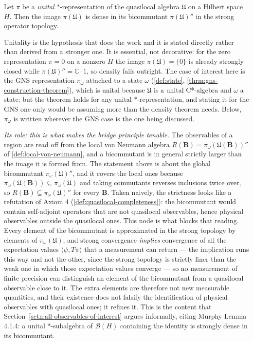 \begin{theorem}
    \label{thrm:quasilocal-strongly-dense}
    \leanok
    Let $\pi$ be a \emph{unital} $*$-representation of the quasilocal algebra $\mathfrak{U}$ on a Hilbert space $H$. Then the image $\pi(\mathfrak{U})$ is dense in its bicommutant $\pi(\mathfrak{U})''$ in the strong operator topology.

    Unitality is the hypothesis that does the work and it is stated directly rather than derived from a stronger one. It is essential, not decorative: for the zero representation $\pi = 0$ on a nonzero $H$ the image $\pi(\mathfrak{U}) = \{0\}$ is already strongly closed while $\pi(\mathfrak{U})'' = \mathbb{C}\cdot 1$, so density fails outright. The case of interest here is the GNS representation $\pi_\omega$ attached to a state $\omega$ (\ref{def:state}, \ref{thrm:gns-construction-theorem}), which is unital because $\mathfrak{U}$ is a unital C*-algebra and $\omega$ a state; but the theorem holds for any unital $*$-representation, and stating it for the GNS one only would be assuming more than the density theorem needs. Below, $\pi_\omega$ is written wherever the GNS case is the one being discussed.

    \emph{Its role: this is what makes the bridge principle tenable.} The observables of a region are read off from the local von Neumann algebra $R(\mathbf{B}) = \pi_\omega(\mathfrak{U}(\mathbf{B}))''$ of \ref{def:local-von-neumann}, and a bicommutant is in general strictly larger than the image it is formed from. The statement above is about the global bicommutant $\pi_\omega(\mathfrak{U})''$, and it covers the local ones because $\pi_\omega(\mathfrak{U}(\mathbf{B})) \subseteq \pi_\omega(\mathfrak{U})$ and taking commutants reverses inclusions twice over, so $R(\mathbf{B}) \subseteq \pi_\omega(\mathfrak{U})''$ for every $\mathbf{B}$. Taken naively, the strictness looks like a refutation of Axiom 4 (\ref{def:quasilocal-completeness}): the bicommutant would contain self-adjoint operators that are not quasilocal observables, hence physical observables outside the quasilocal ones. This node is what blocks that reading. Every element of the bicommutant is approximated in the strong topology by elements of $\pi_\omega(\mathfrak{U})$, and strong convergence \emph{implies} convergence of all the expectation values $\langle \psi, T \psi \rangle$ that a measurement can return --- the implication runs this way and not the other, since the strong topology is strictly finer than the weak one in which those expectation values converge --- so no measurement of finite precision can distinguish an element of the bicommutant from a quasilocal observable close to it. The extra elements are therefore not new measurable quantities, and their existence does not falsify the identification of physical observables with quasilocal ones; it refines it. This is the content that Section~\ref{sctn:all-observables-of-interest} argues informally, citing Murphy Lemma 4.1.4: a unital $*$-subalgebra of $\mathcal{B}(H)$ containing the identity is strongly dense in its bicommutant.


\end{theorem}
